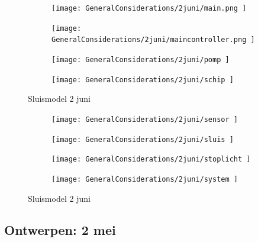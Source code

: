 \documentclass{article}
\begin{document}
	
	
	
	\begin{figure}
		\centering
		\begin{subfigure}{0.45\linewidth}
			\texttt{[image: GeneralConsiderations/2juni/main.png ]}
			\caption{}
			\label{fig:1a}
		\end{subfigure}\hfill
		\begin{subfigure}{0.45\linewidth}
			\texttt{[image: GeneralConsiderations/2juni/maincontroller.png ]}
			\caption{}
			\label{fig:1a}
		\end{subfigure}
		
		\begin{subfigure}{0.45\linewidth}
			\texttt{[image: GeneralConsiderations/2juni/pomp ]}
			\caption{}
			\label{fig:1a}
		\end{subfigure}\hfill
		\begin{subfigure}{0.45\linewidth}
			\texttt{[image: GeneralConsiderations/2juni/schip ]}
			\caption{}
			\label{fig:1a}
		\end{subfigure}
		\caption{Sluismodel 2 juni}
		\label{fig:1}
	\end{figure}
	
	
	
	
	\begin{figure}
		\centering
		\begin{subfigure}{0.45\linewidth}
			\texttt{[image: GeneralConsiderations/2juni/sensor ]}
			\caption{}
			\label{fig:1a}
		\end{subfigure}\hfill
		\begin{subfigure}{0.45\linewidth}
			\texttt{[image: GeneralConsiderations/2juni/sluis ]}
			\caption{}
			\label{fig:1a}
		\end{subfigure}
		
		\begin{subfigure}{0.45\linewidth}
			\texttt{[image: GeneralConsiderations/2juni/stoplicht ]}
			\caption{}
			\label{fig:1a}
		\end{subfigure}\hfill
		\begin{subfigure}{0.45\linewidth}
			\texttt{[image: GeneralConsiderations/2juni/system ]}
			\caption{}
			\label{fig:1a}
		\end{subfigure}
		\caption{Sluismodel 2 juni}
		\label{fig:1}
	\end{figure}
	\newpage
	\subsection{Ontwerpen: 2 mei}
	
\end{document}
